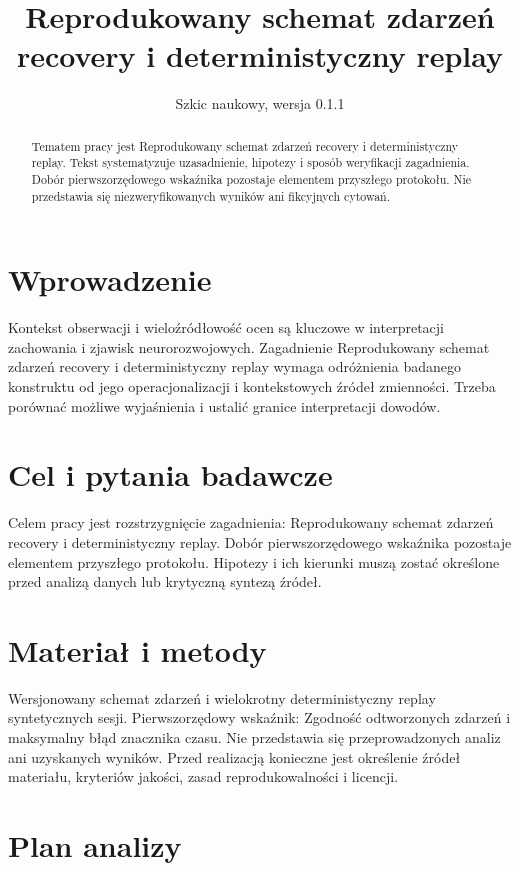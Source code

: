 \documentclass[11pt,a4paper]{article}
\title{Reprodukowany schemat zdarzeń recovery i deterministyczny replay}
\author{}
\date{Szkic naukowy, wersja 0.1.1}
\begin{document}
\maketitle

\begin{abstract}

Tematem pracy jest Reprodukowany schemat zdarzeń recovery i deterministyczny replay. Tekst systematyzuje uzasadnienie, hipotezy i sposób weryfikacji zagadnienia. Dobór pierwszorzędowego wskaźnika pozostaje elementem przyszłego protokołu. Nie przedstawia się niezweryfikowanych wyników ani fikcyjnych cytowań.

\end{abstract}

\section{Wprowadzenie}

Kontekst obserwacji i wieloźródłowość ocen są kluczowe w interpretacji zachowania i zjawisk neurorozwojowych. Zagadnienie Reprodukowany schemat zdarzeń recovery i deterministyczny replay wymaga odróżnienia badanego konstruktu od jego operacjonalizacji i kontekstowych źródeł zmienności. Trzeba porównać możliwe wyjaśnienia i ustalić granice interpretacji dowodów.

\section{Cel i pytania badawcze}

Celem pracy jest rozstrzygnięcie zagadnienia: Reprodukowany schemat zdarzeń recovery i deterministyczny replay. Dobór pierwszorzędowego wskaźnika pozostaje elementem przyszłego protokołu. Hipotezy i ich kierunki muszą zostać określone przed analizą danych lub krytyczną syntezą źródeł.

\section{Materiał i metody}

Wersjonowany schemat zdarzeń i wielokrotny deterministyczny replay syntetycznych sesji. Pierwszorzędowy wskaźnik: Zgodność odtworzonych zdarzeń i maksymalny błąd znacznika czasu. Nie przedstawia się przeprowadzonych analiz ani uzyskanych wyników. Przed realizacją konieczne jest określenie źródeł materiału, kryteriów jakości, zasad reprodukowalności i licencji.

\section{Plan analizy}
\end{document}
